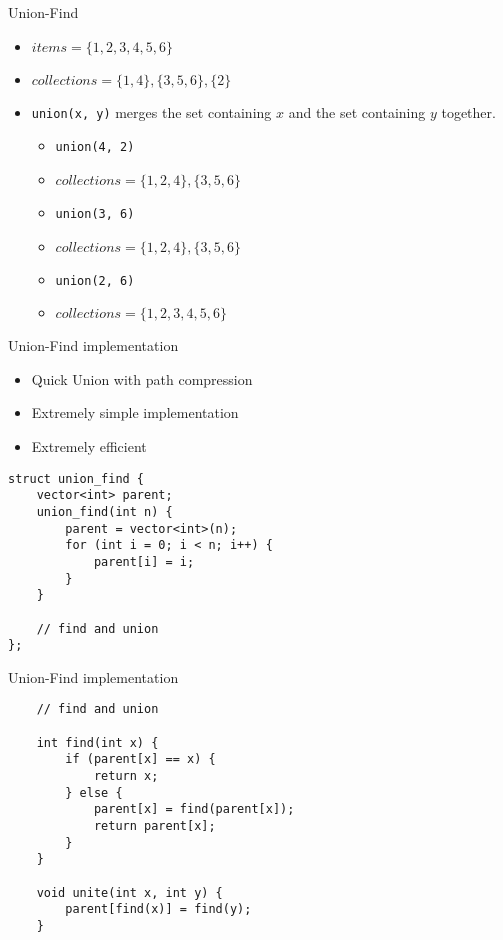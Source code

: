 \documentclass[12pt,t]{beamer}
\newcommand{\bi}{\begin{itemize}}
\newcommand{\ei}{\end{itemize}}
\begin{document}
\begin{frame}{Union-Find}
    \bi
        \vspace{10pt}
        \item $items = \{1,2,3,4,5,6\}$
        \item $collections = \{1,4\}, \{3,5,6\}, \{2\}$
        \vspace{10pt}
        \item \texttt{union(x, y)} merges the set containing $x$ and the set containing $y$ together.
        \vspace{10pt}
            \bi
                \item \texttt{union(4, 2)}
                \item $collections = \{1,2,4\}, \{3,5,6\}$
                \item \texttt{union(3, 6)}
                \item $collections = \{1,2,4\}, \{3,5,6\}$
                \item \texttt{union(2, 6)}
                \item $collections = \{1,2,3,4,5,6\}$
            \ei
    \ei
\end{frame}

\begin{frame}[fragile]{Union-Find implementation}
    \bi
        \item Quick Union with path compression
        \item Extremely simple implementation
        \item Extremely efficient
    \ei

    \vspace{10pt}

    \begin{verbatim}
struct union_find {
    vector<int> parent;
    union_find(int n) {
        parent = vector<int>(n);
        for (int i = 0; i < n; i++) {
            parent[i] = i;
        }
    }

    // find and union
};
    \end{verbatim}
\end{frame}

\begin{frame}[fragile]{Union-Find implementation}

    \begin{verbatim}
    // find and union

    int find(int x) {
        if (parent[x] == x) {
            return x;
        } else {
            parent[x] = find(parent[x]);
            return parent[x];
        }
    }

    void unite(int x, int y) {
        parent[find(x)] = find(y);
    }
    \end{verbatim}
\end{frame}
\end{document}
